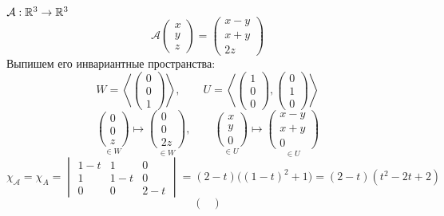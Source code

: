 \begin{eg}
	$ \mathcal{A} : \R^3 \to \R^3 $
	$$ \mathcal{A}
	\begin{pmatrix}
		x \\
		y \\
		z
	\end{pmatrix} =
	\begin{pmatrix}
		x - y \\
		x + y \\
		2z
	\end{pmatrix} $$
	Выпишем его инвариантные пространства:
	$$ W = \left\langle
	\begin{pmatrix}
		0 \\
		0 \\
		1
	\end{pmatrix} \right\rangle, \qquad U = \left\langle
	\begin{pmatrix}
		1 \\
		0 \\
		0
	\end{pmatrix},
	\begin{pmatrix}
		0 \\
		1 \\
		0
	\end{pmatrix} \right\rangle $$
	$$ \underset{\in W}{
	\begin{pmatrix}
		0 \\
		0 \\
		z
	\end{pmatrix}} \mapsto \underset{\in W}{
	\begin{pmatrix}
		0 \\
		0 \\
		2z
	\end{pmatrix}}, \qquad \underset{\in U}{
	\begin{pmatrix}
		x \\
		y \\
		0
	\end{pmatrix}} \mapsto \underset{\in U}{
	\begin{pmatrix}
		x - y \\
		x + y \\
		0
	\end{pmatrix}} $$
	$$ \chi_{\mathcal{A}} = \chi_A =
	\begin{vmatrix}
		1 - t & 1 & 0 \\
		1 & 1 - t & 0 \\
		0 & 0 & 2 - t
	\end{vmatrix} = (2 - t) \bigg( (1 - t)^2 + 1 \bigg) = (2 - t)(t^2 - 2t + 2) $$
	$$
	\begin{pmatrix}

\end{pmatrix}$$
\end{eg}

